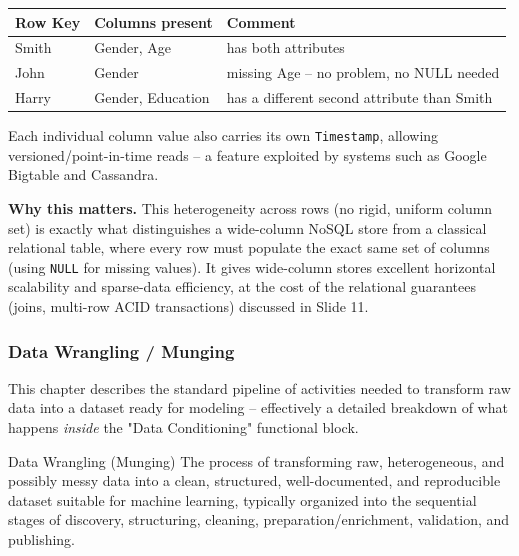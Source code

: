 \begin{center}
\begin{tabular}{lll}
\toprule
\textbf{Row Key} & \textbf{Columns present} & \textbf{Comment} \\
\midrule
Smith & Gender, Age & has both attributes \\
John & Gender & missing Age -- no problem, no NULL needed \\
Harry & Gender, Education & has a different second attribute than Smith \\
\bottomrule
\end{tabular}
\end{center}

Each individual column value also carries its own \texttt{Timestamp}, allowing versioned/point-in-time reads -- a feature exploited by systems such as Google Bigtable and Cassandra.

\textbf{Why this matters.} This heterogeneity across rows (no rigid, uniform column set) is exactly what distinguishes a wide-column NoSQL store from a classical relational table, where every row must populate the exact same set of columns (using \texttt{NULL} for missing values). It gives wide-column stores excellent horizontal scalability and sparse-data efficiency, at the cost of the relational guarantees (joins, multi-row ACID transactions) discussed in Slide 11.

\subsubsection{Data Wrangling / Munging}

This chapter describes the standard pipeline of activities needed to transform raw data into a dataset ready for modeling -- effectively a detailed breakdown of what happens \emph{inside} the "Data Conditioning" functional block.

\begin{defbox}{Data Wrangling (Munging)}
The process of transforming raw, heterogeneous, and possibly messy data into a clean, structured, well-documented, and reproducible dataset suitable for machine learning, typically organized into the sequential stages of discovery, structuring, cleaning, preparation/enrichment, validation, and publishing.
\end{defbox}


